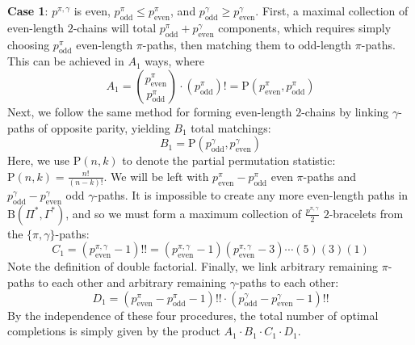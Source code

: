{\bf Case 1}: $p^{\pi, \gamma}$ is even, $p^\pi_{\mathrm{odd}} \leq p^\pi_{\mathrm{even}}$, and $p^\gamma_{\mathrm{odd}} \geq p^\gamma_{\mathrm{even}}$.  First, a maximal collection of even-length $2$-chains will total $p^\pi_{\mathrm{odd}} + p^\gamma_{\mathrm{even}}$ components, which requires simply choosing $p^\pi_{\mathrm{odd}}$ even-length $\pi$-paths, then matching them to odd-length $\pi$-paths.  This can be achieved in $A_1$ ways, where
\begin{equation}
A_1 = \binom{p^\pi_{\mathrm{even}}}{p^\pi_{\mathrm{odd}}} \cdot \left(p^\pi_{\mathrm{odd}}\right)! = \mathrm{P}\left(p^\pi_{\mathrm{even}}, p^\pi_{\mathrm{odd}}\right)
\end{equation}
Next, we follow the same method for forming even-length $2$-chains by linking $\gamma$-paths of opposite parity, yielding $B_1$ total matchings:
\begin{equation}
B_1 = \mathrm{P}\left(p^\gamma_{\mathrm{odd}}, p^\gamma_{\mathrm{even}}\right)
\end{equation}
Here, we use $\mathrm{P}(n, k)$ to denote the partial permutation statistic: $\mathrm{P}(n, k) = \frac{n!}{(n-k)!}$.  We will be left with $p^\pi_{\mathrm{even}} - p^\pi_{\mathrm{odd}}$ even $\pi$-paths and $p^\gamma_{\mathrm{odd}} - p^\gamma_{\mathrm{even}}$ odd $\gamma$-paths.  It is impossible to create any more even-length paths in $\textrm{B}(\Pi^*, \Gamma^*)$, and so we must form a maximum collection of $\frac{p^{\pi, \gamma}}{2}$ $2$-bracelets from the $\{\pi, \gamma\}$-paths:
\begin{equation}
C_1 = \left(p^{\pi, \gamma}_{\mathrm{even}} - 1\right)!! = \left(p^{\pi, \gamma}_{\mathrm{even}} - 1\right)\left(p^{\pi, \gamma}_{\mathrm{even}} - 3\right) \cdots (5)(3)(1)
\end{equation}
Note the definition of double factorial.  Finally, we link arbitrary remaining $\pi$-paths to each other and arbitrary remaining $\gamma$-paths to each other:
\begin{equation}
D_1 = \left(p^\pi_{\mathrm{even}} - p^\pi_{\mathrm{odd}} - 1\right)!! \cdot \left(p^\gamma_{\mathrm{odd}} - p^\gamma_{\mathrm{even}} - 1\right)!!
\end{equation}
By the independence of these four procedures, the total number of optimal completions is simply given by the product $A_1 \cdot B_1 \cdot C_1 \cdot D_1$.\bigskip

